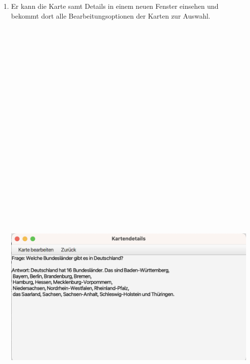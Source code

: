 \begin{enumerate}
    \item Er kann die Karte samt Details in einem neuen Fenster einsehen und bekommt dort alle Bearbeitungsoptionen der Karten zur Auswahl.
    \begin{center}\includegraphics[width=17cm,height=35cm,keepaspectratio]{images/overview-details3.png}\end{center} 
       
\end{enumerate} 
